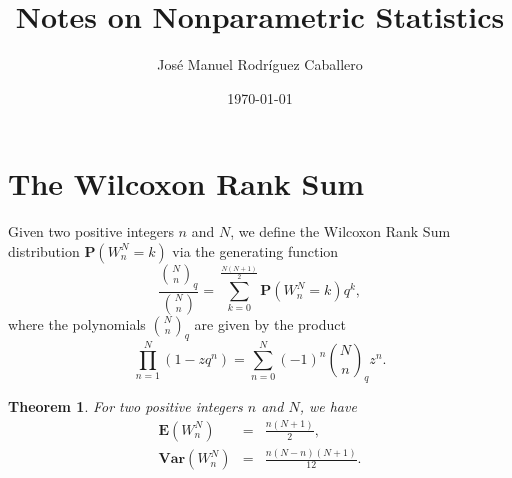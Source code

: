 \documentclass[12pt]{article} %
\title{Notes on Nonparametric Statistics}
\author{José Manuel Rodríguez Caballero}
\date{\today}
\newtheorem{theorem}{Theorem}
\theoremstyle{remark}
\begin{document}
\maketitle %

\section{The Wilcoxon Rank Sum}
Given two positive integers $n$ and $N$, we define the Wilcoxon Rank Sum distribution $\mathbf{P}\left( W^N_n = k\right)$ via the generating function
\begin{equation}
\frac{\binom{N}{n}_q}{\binom{N}{n}} = \sum_{k=0}^{\frac{N(N+1)}{2}}  \mathbf{P}\left( W^N_n = k\right) q^k, 
\end{equation}
where the polynomials $\binom{N}{n}_q$ are given by the product
\begin{equation}
\prod_{n=1}^N \left( 1 - z q^n\right) = \sum_{n=0}^N (-1)^n  \binom{N}{n}_q z^n.
\end{equation}

\begin{theorem}
For two positive integers $n$ and $N$, we have
\begin{eqnarray}
\label{eq:expectation_W} \mathbf{E}\left( W^N_n \right) &=& \frac{n(N+1)}{2}, \\
\label{eq:variance_W} \mathbf{Var}\left( W^N_n \right) &=& \frac{n(N-n)(N+1)}{12}.
\end{eqnarray}
\end{theorem}
\end{document}
